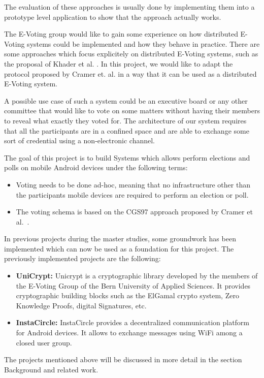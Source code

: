 \documentclass[numbers=noenddot, abstract=on]{scrreprt}
\begin{document}
The evaluation of these approaches is usually done by implementing them into a
prototype level application to show that the approach actually works.

The E-Voting group would like to gain some experience on how distributed
E-Voting systems could be implemented and how they behave in practice. There are
some approaches which focus explicitely on distributed E-Voting systems, such as
the proposal of Khader et al. \cite{HKRS12}. In this project, we would like to
adapt the protocol proposed by Cramer et. al. \cite{CGS97} in a way that it can
be used as a distributed E-Voting system.

A possible use case of such a system could be an executive board or any other
committee that would like to vote on some matters without having their members
to reveal what exactly they voted for. The architecture of our system requires
that all the participants are in a confined space and are able to exchange some
sort of credential using a non-electronic channel.

The goal of this project is to build Systems which allows perform elections and
polls on mobile Android devices under the following terms:
\begin{itemize}
  \item Voting needs to be done ad-hoc, meaning that no infrastructure other
  than the participants mobile devices are required to perform an election or
  poll.
  \item The voting schema is based on the CGS97 approach proposed by Cramer et
  al.~\cite{CGS97}.
\end{itemize}

In previous projects during the master studies, some groundwork has been
implemented which can now be used as a foundation for this project. The
previously implemented projects are the following:
\begin{itemize}
  \item \textbf{UniCrypt:} Unicrypt is a cryptographic library developed by the
  members of the E-Voting Group of the Bern University of Applied Sciences. It
  provides cryptographic building blocks such as the ElGamal crypto system, Zero
  Knowledge Proofs, digital Signatures, etc. 
  \item \textbf{InstaCircle: } InstaCircle provides a decentralized
  communication platform for Android devices. It allows to exchange messages
  using WiFi among a closed user group.
\end{itemize}
The projects mentioned above will be discussed in more detail in the section
Background and related work.
\end{document}
